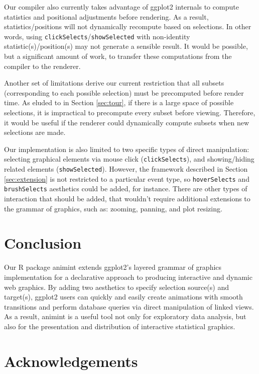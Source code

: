 \documentclass[12pt,]{isuthesis}
\begin{document}
Our compiler also currently takes advantage of ggplot2 internals to
compute statistics and positional adjustments before rendering. As a
result, statistics/positions will not dynamically recompute based on
selections. In other words, using
\texttt{clickSelects}/\texttt{showSelected} with non-identity
statistic(s)/position(s) may not generate a sensible result. It would be
possible, but a significant amount of work, to transfer these
computations from the compiler to the renderer.

Another set of limitations derive our current restriction that all
subsets (corresponding to each possible selection) must be precomputed
before render time. As eluded to in Section \ref{sec:tour}, if there is
a large space of possible selections, it is impractical to precompute
every subset before viewing. Therefore, it would be useful if the
renderer could dynamically compute subsets when new selections are made.

Our implementation is also limited to two specific types of direct
manipulation: selecting graphical elements via mouse click
(\texttt{clickSelects}), and showing/hiding related elements
(\texttt{showSelected}). However, the framework described in Section
\ref{sec:extension} is not restricted to a particular event type, so
\texttt{hoverSelects} and \texttt{brushSelects} aesthetics could be
added, for instance. There are other types of interaction that should be
added, that wouldn't require additional extensions to the grammar of
graphics, such as: zooming, panning, and plot resizing.

\section{Conclusion}

Our R package animint extends ggplot2's layered grammar of graphics
implementation for a declarative approach to producing interactive and
dynamic web graphics. By adding two aesthetics to specify selection
source(s) and target(s), ggplot2 users can quickly and easily create
animations with smooth transitions and perform database queries via
direct manipulation of linked views. As a result, animint is a useful
tool not only for exploratory data analysis, but also for the
presentation and distribution of interactive statistical graphics.

\section*{Acknowledgements}
\end{document}

